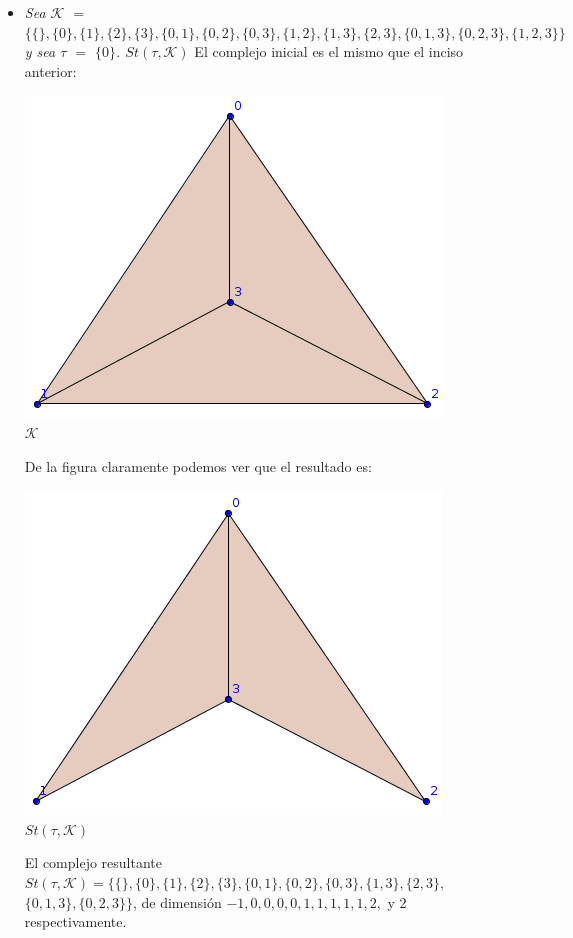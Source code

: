 \documentclass{article}
\begin{document}
\begin{enumerate}
{\begin{itemize}
    \item{
        \textsl{
          Sea $\mathcal{K}$ $=$ $\{ \{ \}, \{0\} , \{1\}, \{2\}, \{3\}, \{0, 1\},\{0,
              2\}, \{0, 3\},\{1, 2\}, \{1, 3\}, \{2, 3\},
              \{0,1,3\},\{0,2,3\},\{1,2,3\}\}$ y sea $\tau$ $=$ $\{0\}$. $St(\tau,\mathcal{K})$
        }
        El complejo inicial es el mismo que el inciso anterior:
        \begin{center}
          \includegraphics[scale=0.4]{entrada3_2.png}
          \\ $\mathcal{K}$
        \end{center}
        De la figura claramente podemos ver que el resultado es:
        \begin{center}
          \includegraphics[scale=0.4]{salida3_3.png}
          \\ $St(\tau,\mathcal{K})$
        \end{center}
        El complejo resultante $St(\tau,\mathcal{K}) = \{\{\},\{0\},\{1\},\{2\},\{3\}, \{0,1\}, \{0,2\},
        \{0,3\}, \{1,3\}, \{2,3\},$\\ $\{0,1,3\},\{0,2,3\}\}$, de dimensión $-1, 0, 0, 0, 0, 1, 1, 1, 1,
        1, 2,$ y $2$ respectivamente.
      }


\end{itemize}}
\end{enumerate}
\end{document}
